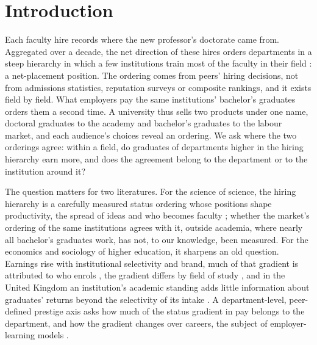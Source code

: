 \documentclass[11pt]{article}
\begin{document}
\section{Introduction}\label{sec:intro}

Each faculty hire records where the new professor's doctorate came from. Aggregated over a decade, the net
direction of these hires orders departments in a steep hierarchy in which a few institutions train most of the
faculty in their field \citep{clauset2015systematic, wapman2022quantifying}: a net-placement position. The
ordering comes from peers' hiring decisions, not from admissions statistics, reputation surveys or composite
rankings, and it exists field by field. What employers pay the same institutions' bachelor's graduates orders
them a second time. A university thus sells two products under one name, doctoral graduates to the academy and bachelor's
graduates to the labour market, and each audience's choices reveal an ordering. We ask where the two orderings
agree: within a field, do graduates of departments higher in the hiring hierarchy earn more, and does the
agreement belong to the department or to the institution around it?

The question matters for two literatures. For the science of science, the hiring hierarchy is a carefully
measured status ordering whose positions shape productivity, the spread of ideas and who becomes faculty
\citep{way2019productivity, morgan2018prestige, morgan2022socioeconomic, zhang2022labor}; whether the market's
ordering of the same institutions agrees with it, outside academia, where nearly all bachelor's graduates work, has
not, to our knowledge, been measured.
For the economics and sociology of higher education, it sharpens an old question. Earnings rise with
institutional selectivity and brand, much of that gradient is attributed to who enrols
\citep{dale2002estimating, dale2014estimating, mountjoy2021returns}, the gradient differs by field of study
\citep{eide2016where, quadlin2021same, hastings2013some, bloem2024understanding}, and in the United Kingdom an
institution's academic standing adds little information about graduates' returns beyond the selectivity of its
intake \citep{britton2022how}. A department-level, peer-defined prestige axis asks how much of the status gradient
in pay belongs to the department, and how the gradient changes over careers, the subject of employer-learning
models \citep{farber1996learning, altonji2001employer}.
\end{document}
